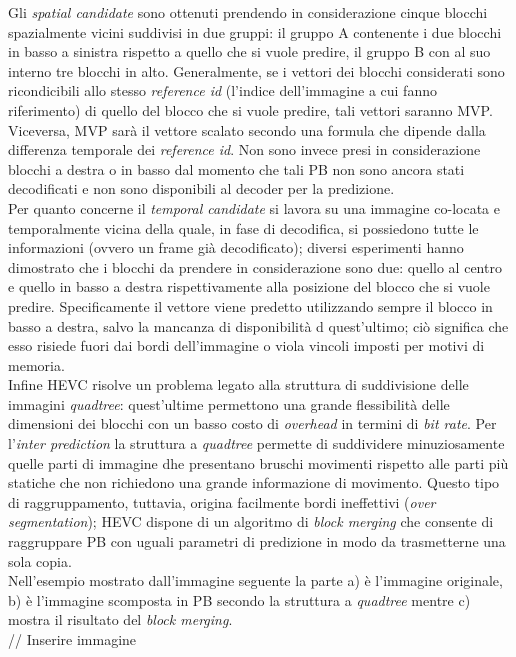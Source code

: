 Gli \emph{spatial candidate} sono ottenuti prendendo in considerazione cinque 
blocchi spazialmente vicini suddivisi in due gruppi: il gruppo A contenente i 
due blocchi in basso a sinistra rispetto a quello che si vuole predire, il 
gruppo B con al suo interno tre blocchi in alto.
Generalmente, se i vettori dei blocchi considerati sono ricondicibili allo 
stesso \emph{reference id} (l'indice dell'immagine a cui fanno 
riferimento) di quello del blocco che si vuole predire, tali vettori saranno 
MVP.
Viceversa, MVP sarà il vettore scalato secondo una formula che dipende dalla 
differenza temporale dei \emph{reference id}.
Non sono invece presi in considerazione blocchi a destra o in basso dal 
momento che tali PB non sono ancora stati decodificati e non sono disponibili 
al decoder per la predizione.
\\
Per quanto concerne il \emph{temporal candidate} si lavora su una immagine 
co-locata e temporalmente vicina della quale, in fase di decodifica, si 
possiedono tutte le informazioni (ovvero un frame già decodificato); diversi 
esperimenti hanno dimostrato che i blocchi da prendere in considerazione sono 
due: quello al centro e quello in basso a destra rispettivamente alla posizione 
del blocco che si vuole predire.
Specificamente il vettore viene predetto utilizzando sempre il blocco in basso 
a destra, salvo la mancanza di disponibilità d quest'ultimo; ciò significa che 
esso risiede fuori dai bordi dell'immagine o viola vincoli imposti per motivi 
di memoria.
\newline \\
Infine HEVC risolve un problema legato alla struttura di suddivisione delle 
immagini \emph{quadtree}: quest'ultime permettono una grande flessibilità 
delle dimensioni dei blocchi con un basso costo di \emph{overhead} in termini 
di \emph{bit rate}. Per l'\emph{inter prediction} la struttura a \emph{quadtree}
 permette di suddividere minuziosamente quelle parti di immagine dhe presentano 
bruschi movimenti rispetto alle parti più statiche che non richiedono una 
grande informazione di movimento. Questo tipo di raggruppamento, tuttavia, 
origina facilmente bordi ineffettivi (\emph{over segmentation}); HEVC dispone 
di un  algoritmo di \emph{block merging} che consente di raggruppare PB con 
uguali parametri di predizione in modo da trasmetterne una sola copia.
\\
Nell'esempio mostrato dall'immagine seguente la parte a) è l'immagine 
originale, b) è l'immagine scomposta in PB secondo la struttura a 
\emph{quadtree} mentre c) mostra il risultato del \emph{block merging}.
\\
// Inserire immagine 
\\

